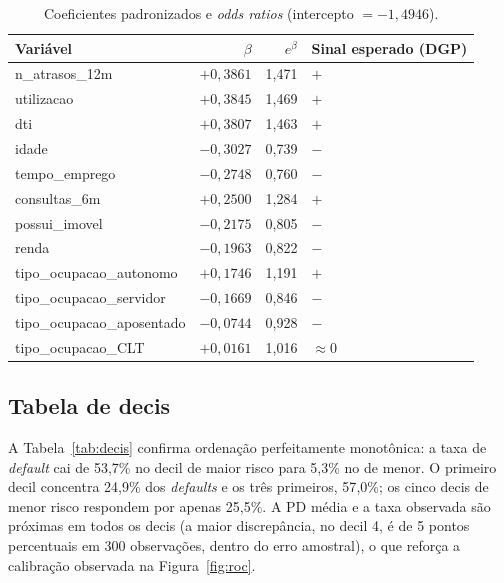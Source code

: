 \documentclass[11pt,a4paper]{article}
\begin{document}
\begin{table}[H]
\centering\small
\caption{Coeficientes padronizados e \emph{odds ratios} (intercepto $=-1{,}4946$).}
\label{tab:coefs}
\begin{tabular}{lrrl}
\toprule
Variável & $\beta$ & $e^{\beta}$ & Sinal esperado (DGP) \\
\midrule
n\_atrasos\_12m & $+0{,}3861$ & 1,471 & $+$ \\
utilizacao & $+0{,}3845$ & 1,469 & $+$ \\
dti & $+0{,}3807$ & 1,463 & $+$ \\
idade & $-0{,}3027$ & 0,739 & $-$ \\
tempo\_emprego & $-0{,}2748$ & 0,760 & $-$ \\
consultas\_6m & $+0{,}2500$ & 1,284 & $+$ \\
possui\_imovel & $-0{,}2175$ & 0,805 & $-$ \\
renda & $-0{,}1963$ & 0,822 & $-$ \\
tipo\_ocupacao\_autonomo & $+0{,}1746$ & 1,191 & $+$ \\
tipo\_ocupacao\_servidor & $-0{,}1669$ & 0,846 & $-$ \\
tipo\_ocupacao\_aposentado & $-0{,}0744$ & 0,928 & $-$ \\
tipo\_ocupacao\_CLT & $+0{,}0161$ & 1,016 & $\approx 0$ \\
\bottomrule
\end{tabular}
\end{table}

\subsection{Tabela de decis}

A Tabela~\ref{tab:decis} confirma ordenação perfeitamente monotônica: a taxa de \emph{default} cai de 53{,}7\% no decil de maior risco para 5{,}3\% no de menor. O primeiro decil concentra 24{,}9\% dos \emph{defaults} e os três primeiros, 57{,}0\%; os cinco decis de menor risco respondem por apenas 25{,}5\%. A PD média e a taxa observada são próximas em todos os decis (a maior discrepância, no decil 4, é de 5 pontos percentuais em 300 observações, dentro do erro amostral), o que reforça a calibração observada na Figura~\ref{fig:roc}.
\end{document}
